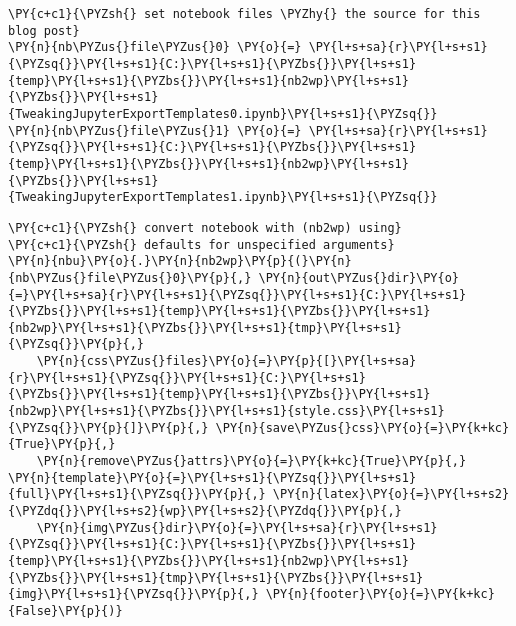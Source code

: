     \begin{tcolorbox}[breakable, size=fbox, boxrule=1pt, pad at break*=1mm,colback=cellbackground, colframe=cellborder]
\begin{Verbatim}[commandchars=\\\{\}]
\PY{c+c1}{\PYZsh{} set notebook files \PYZhy{} the source for this blog post}
\PY{n}{nb\PYZus{}file\PYZus{}0} \PY{o}{=} \PY{l+s+sa}{r}\PY{l+s+s1}{\PYZsq{}}\PY{l+s+s1}{C:}\PY{l+s+s1}{\PYZbs{}}\PY{l+s+s1}{temp}\PY{l+s+s1}{\PYZbs{}}\PY{l+s+s1}{nb2wp}\PY{l+s+s1}{\PYZbs{}}\PY{l+s+s1}{TweakingJupyterExportTemplates0.ipynb}\PY{l+s+s1}{\PYZsq{}}
\PY{n}{nb\PYZus{}file\PYZus{}1} \PY{o}{=} \PY{l+s+sa}{r}\PY{l+s+s1}{\PYZsq{}}\PY{l+s+s1}{C:}\PY{l+s+s1}{\PYZbs{}}\PY{l+s+s1}{temp}\PY{l+s+s1}{\PYZbs{}}\PY{l+s+s1}{nb2wp}\PY{l+s+s1}{\PYZbs{}}\PY{l+s+s1}{TweakingJupyterExportTemplates1.ipynb}\PY{l+s+s1}{\PYZsq{}}
\end{Verbatim}
\end{tcolorbox}

    \begin{tcolorbox}[breakable, size=fbox, boxrule=1pt, pad at break*=1mm,colback=cellbackground, colframe=cellborder]
\begin{Verbatim}[commandchars=\\\{\}]
\PY{c+c1}{\PYZsh{} convert notebook with (nb2wp) using}
\PY{c+c1}{\PYZsh{} defaults for unspecified arguments}
\PY{n}{nbu}\PY{o}{.}\PY{n}{nb2wp}\PY{p}{(}\PY{n}{nb\PYZus{}file\PYZus{}0}\PY{p}{,} \PY{n}{out\PYZus{}dir}\PY{o}{=}\PY{l+s+sa}{r}\PY{l+s+s1}{\PYZsq{}}\PY{l+s+s1}{C:}\PY{l+s+s1}{\PYZbs{}}\PY{l+s+s1}{temp}\PY{l+s+s1}{\PYZbs{}}\PY{l+s+s1}{nb2wp}\PY{l+s+s1}{\PYZbs{}}\PY{l+s+s1}{tmp}\PY{l+s+s1}{\PYZsq{}}\PY{p}{,}
    \PY{n}{css\PYZus{}files}\PY{o}{=}\PY{p}{[}\PY{l+s+sa}{r}\PY{l+s+s1}{\PYZsq{}}\PY{l+s+s1}{C:}\PY{l+s+s1}{\PYZbs{}}\PY{l+s+s1}{temp}\PY{l+s+s1}{\PYZbs{}}\PY{l+s+s1}{nb2wp}\PY{l+s+s1}{\PYZbs{}}\PY{l+s+s1}{style.css}\PY{l+s+s1}{\PYZsq{}}\PY{p}{]}\PY{p}{,} \PY{n}{save\PYZus{}css}\PY{o}{=}\PY{k+kc}{True}\PY{p}{,} 
    \PY{n}{remove\PYZus{}attrs}\PY{o}{=}\PY{k+kc}{True}\PY{p}{,} \PY{n}{template}\PY{o}{=}\PY{l+s+s1}{\PYZsq{}}\PY{l+s+s1}{full}\PY{l+s+s1}{\PYZsq{}}\PY{p}{,} \PY{n}{latex}\PY{o}{=}\PY{l+s+s2}{\PYZdq{}}\PY{l+s+s2}{wp}\PY{l+s+s2}{\PYZdq{}}\PY{p}{,}
    \PY{n}{img\PYZus{}dir}\PY{o}{=}\PY{l+s+sa}{r}\PY{l+s+s1}{\PYZsq{}}\PY{l+s+s1}{C:}\PY{l+s+s1}{\PYZbs{}}\PY{l+s+s1}{temp}\PY{l+s+s1}{\PYZbs{}}\PY{l+s+s1}{nb2wp}\PY{l+s+s1}{\PYZbs{}}\PY{l+s+s1}{tmp}\PY{l+s+s1}{\PYZbs{}}\PY{l+s+s1}{img}\PY{l+s+s1}{\PYZsq{}}\PY{p}{,} \PY{n}{footer}\PY{o}{=}\PY{k+kc}{False}\PY{p}{)}
\end{Verbatim}
\end{tcolorbox}

